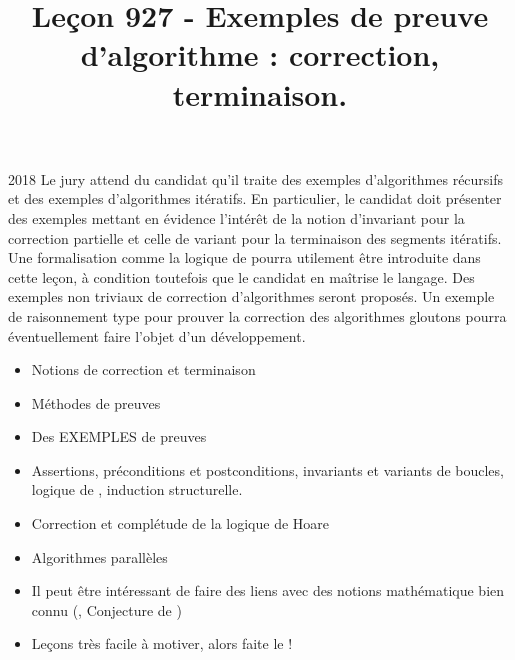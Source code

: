 \documentclass{agregfiche}
\title{Leçon 927 - Exemples de preuve d’algorithme :  correction, terminaison.}
\begin{document}
\maketitle

\secrapports
\begin{rapport}{2018}
    Le jury attend du candidat qu’il traite des exemples d’algorithmes récursifs et des exemples d’algorithmes itératifs.
    En particulier, le candidat doit présenter des exemples mettant en évidence l’intérêt de la notion
    d’invariant pour la correction partielle et celle de variant pour la terminaison des segments itératifs.
    Une formalisation comme la logique de  pourra utilement être introduite dans cette leçon, à
    condition toutefois que le candidat en maîtrise le langage. Des exemples non triviaux de correction
    d’algorithmes seront proposés. Un exemple de raisonnement type pour prouver la correction des algorithmes gloutons pourra éventuellement faire l’objet d’un développement.
\end{rapport}

\secindispensables

\begin{itemize}
	\item Notions de correction et terminaison
    \item Méthodes de preuves
    \item Des EXEMPLES de preuves
\end{itemize}

\secasavoir

\begin{itemize}
	\item Assertions, préconditions et
    postconditions, invariants et variants de boucles, logique de , induction structurelle.
\end{itemize}

\secidees

\begin{itemize}
	\item Correction et complétude de la logique de Hoare
    \item Algorithmes parallèles
\end{itemize}

\secpieges

\begin{itemize}
	\item Il peut être intéressant de faire des liens avec des notions mathématique bien connu (, Conjecture de )
    \item Leçons très facile à motiver, alors faite le !
\end{itemize}
\end{document}
